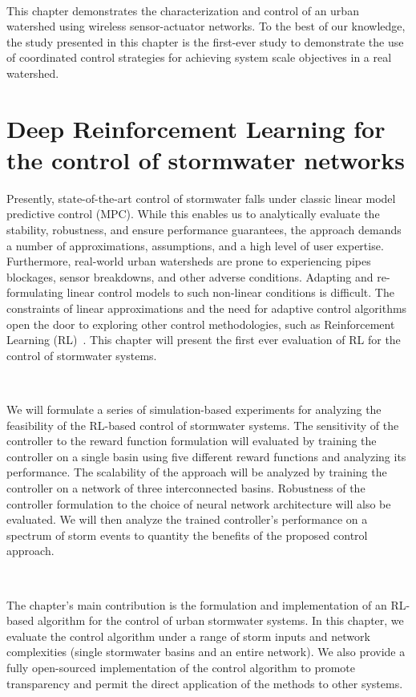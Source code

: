 \

This chapter demonstrates the characterization and control of an urban watershed using wireless sensor-actuator networks. To the best of our knowledge, the study presented in this chapter is the first-ever study to demonstrate the use of coordinated control strategies for achieving system scale objectives in a real watershed.

\section{Deep Reinforcement Learning for the control of stormwater networks}

Presently, state-of-the-art control of stormwater falls under classic linear model predictive control (MPC).
While this enables us to analytically evaluate the stability, robustness, and ensure performance guarantees, the approach demands a number of approximations, assumptions, and a high level of user expertise.
Furthermore, real-world urban watersheds are prone to experiencing pipes blockages, sensor breakdowns, and other adverse conditions.
Adapting and re-formulating linear control models to such non-linear conditions is difficult.
The constraints of linear approximations and the need for adaptive control algorithms open the door to exploring other control methodologies, such as Reinforcement Learning (RL)~\cite{Mnih2015}.
This chapter will present the first ever evaluation of RL for the control of stormwater systems.

\

We will formulate a series of simulation-based experiments for analyzing the feasibility of the RL-based control of stormwater systems.
The sensitivity of the controller to the reward function formulation will evaluated by training the controller on a single basin using five different reward functions and analyzing its performance.
The scalability of the approach will be analyzed by training the controller on a network of three interconnected basins.
Robustness of the controller formulation to the choice of neural network architecture will also be evaluated.
We will then analyze the trained controller's performance on a spectrum of storm events to quantity the benefits of the proposed control approach.

\

The chapter's main contribution is the formulation and implementation of an RL-based algorithm for the control of urban stormwater systems. In this chapter, we evaluate the control algorithm under a range of storm inputs and network complexities (single stormwater basins and an entire network). 
We also provide a fully open-sourced implementation of the control algorithm to promote transparency and permit the direct application of the methods to other systems.


